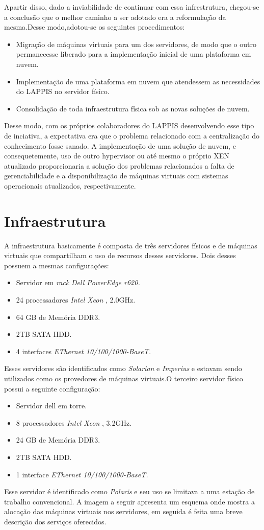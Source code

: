       Apartir disso, dado a inviabilidade de continuar com essa infrestrutura, chegou-se a conclusão que o melhor caminho a ser adotado era a reformulação da mesma.Desse modo,adotou-se os seguintes procedimentos:
\begin{itemize}
      \item Migração de máquinas virtuais para um dos servidores, de modo que o outro permanecesse liberado para a implementação inicial de uma plataforma em nuvem.
      \item	Implementação de uma plataforma em nuvem que atendessem as necessidades do LAPPIS no servidor físico.
      \item Consolidação de toda infraestrutura física sob as novas soluções de nuvem.
\end{itemize}      
      
      
Desse modo, com os próprios colaboradores do LAPPIS desenvolvendo esse tipo de inciativa, a expectativa era que o problema relacionado com a centralização do conhecimento fosse sanado. A implementação de uma solução de nuvem, e consequetemente, uso de outro hypervisor ou até mesmo o próprio XEN atualizado proporcionaria a solução dos problemas relacionados a falta de gerenciabilidade e a disponibilização de máquinas virtuais com sistemas operacionais atualizados, respectivamente.        
                
\section{Infraestrutura}
A infraestrutura basicamente é composta de três servidores físicos e de máquinas virtuais que compartilham o uso de recursos desses servidores. Dois desses possuem a mesmas configurações: 
\begin{itemize}
	\item Servidor em \textit{rack} \textit{Dell PowerEdge r620.}
	\item 24 processadores \textit{Intel Xeon }, 2.0GHz.
	\item 64 GB de Memória DDR3.
	\item 2TB SATA HDD.
	\item 4 interfaces \textit{EThernet 10/100/1000-BaseT.}
\end{itemize}
Esses servidores são identificados como \textit{Solarian} e \textit{Imperius} e estavam sendo utilizados como os provedores de máquinas virtuais.O terceiro servidor físico possui a seguinte configuração:
\begin{itemize}
	\item Servidor dell em torre.
	\item 8 processadores \textit{Intel Xeon }, 3.2GHz.
	\item 24 GB de Memória DDR3.
	\item 2TB SATA HDD.
	\item 1 interface \textit{EThernet 10/100/1000-BaseT.}
\end{itemize} 
Esse servidor é identificado como \textit{Polaris} e seu uso se limitava a uma estação de trabalho convencional. A imagem a seguir apresenta um esquema onde mostra a alocação das máquinas virtuais nos servidores, em seguida é feita uma breve descrição dos serviços oferecidos.

